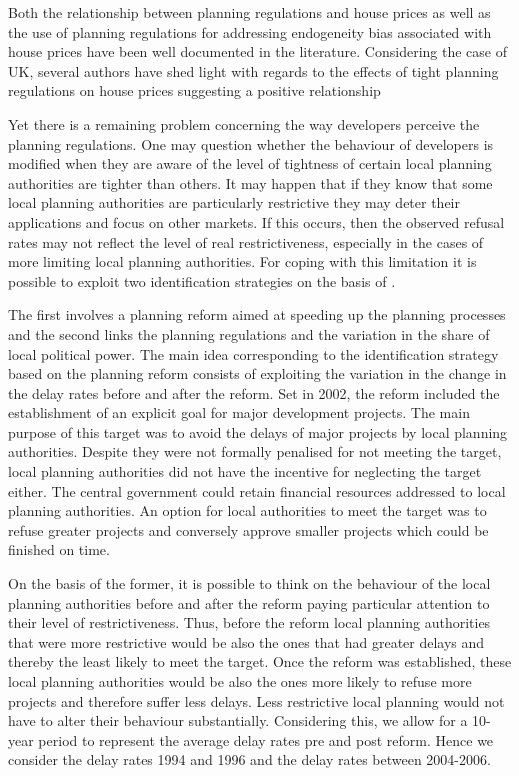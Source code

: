 \documentclass[12pt,letterpaper]{article}
\begin{document}
  Both the relationship between planning regulations and house prices as well as the use of planning regulations 
  for addressing endogeneity bias associated with house prices have been well documented in the literature. 
  Considering the case of UK, several authors have shed light with regards to the effects of tight planning 
  regulations on house prices suggesting a positive relationship \citep{cheshire2009, cheshire2014, barker2004barker, hilber2016supply}
  
 Yet there is a remaining problem concerning the way developers perceive the planning regulations. 
One may question whether the behaviour of developers is modified when they are aware of the level
 of tightness of certain local planning authorities are tighter than others. It may happen that if they know
  that some local planning authorities are particularly restrictive they may deter their applications and focus
   on other markets. If this occurs, then the observed refusal rates may not reflect the level of real 
   restrictiveness, especially in the cases of more limiting local planning authorities. For coping with this
    limitation it is possible to exploit two identification strategies on the basis of \cite{hilber2016supply}.
    
     The first involves a planning reform aimed at speeding up the planning processes and the
      second links the planning regulations and the variation in the share of local political power. 
The main idea corresponding to the identification strategy based on the planning reform consists
 of exploiting the variation in the change in the delay rates before and after the reform. Set in 2002,
  the reform included the establishment of an explicit goal for major development projects. The main
   purpose of this target was to avoid the delays of major projects by local planning authorities. Despite
    they were not formally penalised for not meeting the target, local planning authorities did not have
     the incentive for neglecting the target either. The central government could retain financial resources
      addressed to local planning authorities. An option for local authorities to meet the target was to refuse 
      greater projects and conversely approve smaller projects which could be finished on time. 
      
On the basis of the former, it is possible to think on the behaviour of the local planning authorities
 before and after the reform paying particular attention to their level of restrictiveness. Thus, before 
 the reform local planning authorities that were more restrictive would be also the ones that had greater 
 delays and thereby the least likely to meet the target. Once the reform was established, these local 
 planning authorities would be also the ones more likely to refuse more projects and therefore suffer less
  delays. Less restrictive local planning would not have to alter their behaviour substantially.
   Considering this, we allow for a 10-year period to represent the average delay rates pre and post reform.
    Hence we consider the delay rates 1994 and 1996 and the delay rates between 2004-2006.  
    
\end{document}
